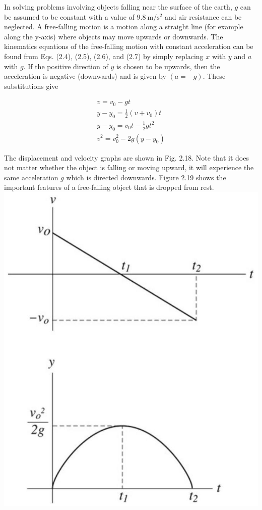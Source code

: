 \documentclass[10pt]{article}
\begin{document}
In solving problems involving objects falling near the surface of the earth, $g$ can be assumed to be constant with a value of $9.8 \mathrm{~m} / \mathrm{s}^{2}$ and air resistance can be neglected. A free-falling motion is a motion along a straight line (for example along the y-axis) where objects may move upwards or downwards. The kinematics equations of the free-falling motion with constant acceleration can be found from Eqs. (2.4), (2.5), (2.6), and (2.7) by simply replacing $x$ with $y$ and $a$ with $g$. If the positive direction of $y$ is chosen to be upwards, then the acceleration is negative (downwards) and is given by $(a=-g)$. These substitutions give

$$
\begin{gathered}
v=v_{0}-g t \\
y-y_{0}=\frac{1}{2}\left(v+v_{0}\right) t \\
y-y_{0}=v_{0} t-\frac{1}{2} g t^{2} \\
v^{2}=v_{0}^{2}-2 g\left(y-y_{0}\right)
\end{gathered}
$$

The displacement and velocity graphs are shown in Fig. 2.18. Note that it does not matter whether the object is falling or moving upward, it will experience the same acceleration $g$ which is directed downwards. Figure 2.19 shows the important features of a free-falling object that is dropped from rest.\\
\includegraphics[max width=\textwidth, center]{2024_09_13_db1f357d2aad0a03eb2eg-035}
\end{document}
